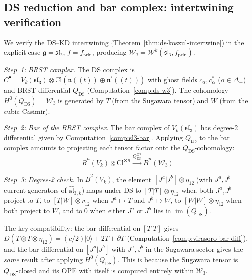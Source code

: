 \subsection{DS reduction and bar complex: intertwining verification}
\label{sec:ds-bar-intertwining}

\begin{computation}
\label{comp:ds-bar-sl3-w3}

We verify the DS--KD intertwining
(Theorem~\ref{thm:ds-koszul-intertwine}) in the explicit case
$\mathfrak{g} = \mathfrak{sl}_3$, $f = f_{\mathrm{prin}}$,
producing $\mathcal{W}_3 = \mathcal{W}^k(\mathfrak{sl}_3, f_{\mathrm{prin}})$.

\emph{Step~1: BRST complex.}
The DS complex is $C^\bullet = V_k(\mathfrak{sl}_3) \otimes
\mathrm{Cl}(\mathfrak{n}((t)) \oplus \mathfrak{n}^*((t)))$ with
ghost fields $c_\alpha, c^*_\alpha$ ($\alpha \in \Delta_+$) and
BRST differential $Q_{\mathrm{DS}}$
(Computation~\ref{comp:ds-w3}).  The cohomology
$H^0(Q_{\mathrm{DS}}) = \mathcal{W}_3$ is generated by
$T$ (from the Sugawara tensor) and $W$ (from the cubic Casimir).

\emph{Step~2: Bar of the BRST complex.}
The bar complex of $V_k(\mathfrak{sl}_3)$ has degree-2 differential
given by Computation~\ref{comp:sl3-bar}.  Applying $Q_{\mathrm{DS}}$
to the bar complex amounts to projecting each tensor factor onto
the $Q_{\mathrm{DS}}$-cohomology:
\[
\bar{B}^n(V_k) \otimes \mathrm{Cl}^{\otimes n}
\xrightarrow{Q_{\mathrm{DS}}^{\otimes n}}
\bar{B}^n(\mathcal{W}_3)
\]

\emph{Step~3: Degree-2 check.}
In $\bar{B}^2(V_k)$, the element $[J^a|J^b] \otimes \eta_{12}$
(with $J^a, J^b$ current generators of $\widehat{\mathfrak{sl}}_{3,k}$)
maps under DS to $[T|T] \otimes \eta_{12}$ when both $J^a, J^b$ project to $T$, to $[T|W] \otimes \eta_{12}$ when $J^a \mapsto T$ and $J^b \mapsto W$, to $[W|W] \otimes \eta_{12}$ when both project to $W$, and to $0$ when either $J^a$ or $J^b$ lies in $\operatorname{im}(Q_{\mathrm{DS}})$.

The key compatibility: the bar differential on $[T|T]$ gives
$D(T \otimes T \otimes \eta_{12}) = (c/2)|0\rangle + 2T + \partial T$
(Computation~\ref{comp:virasoro-bar-diff}), and the bar differential
on $[J^a|J^b]$ with $J^a, J^b$ in the Sugawara sector gives the
\emph{same} result after applying $H^0(Q_{\mathrm{DS}})$.  This is
because the Sugawara tensor is $Q_{\mathrm{DS}}$-closed and its
OPE with itself is computed entirely within $\mathcal{W}_3$.


\end{computation}
